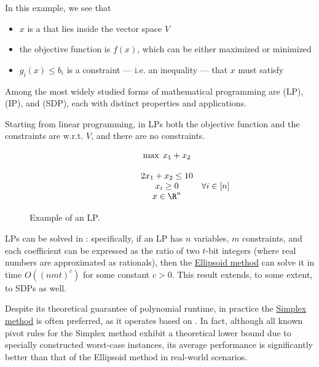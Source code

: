 \documentclass[a4paper, 12pt]{report}
\begin{document}
    In this example, we see that

    \begin{itemize}
        \item $x$ is a  that lies inside the vector space $V$
        \item the objective function is $f(x)$, which can be either maximized or minimized
        \item $g_i(x) \le b_i$ is a constraint --- i.e. an inequality --- that $x$ must satisfy
    \end{itemize}

    Among the most widely studied forms of mathematical programming are  (LP),  (IP), and  (SDP), each with distinct properties and applications.

    Starting from linear programming, in LPs both the objective function and the constraints are  w.r.t. $V$, and there are no  constraints.

    \begin{figure}[H]
        \centering
        \[\begin{array}{ccl}
            \qquad\qquad\quad
            & \max \; x_1 + x_2 \\\\
            & 2x_1 + x_2 \le 10 \\
            & x_i \ge 0 & \forall i \in [n]\\
            & x \in \R^n
        \end{array}\]
        \caption{Example of an LP.}
    \end{figure}
   
    LPs can be solved in : specifically, if an LP has $n$ variables, $m$ constraints, and each coefficient can be expressed as the ratio of two $t$-bit integers (where real numbers are approximated as rationals), then the \href{https://en.wikipedia.org/wiki/Ellipsoid_method}{Ellipsoid method} can solve it in time $O((nmt)^c)$ for some constant $c > 0$. This result extends, to some extent, to SDPs as well.

    Despite its theoretical guarantee of polynomial runtime, in practice the \href{https://en.wikipedia.org/wiki/Simplex_algorithm}{Simplex method} is often preferred, as it operates based on . In fact, although all known pivot rules for the Simplex method exhibit a theoretical  lower bound due to specially constructed worst-case instances, its average performance is significantly better than that of the Ellipsoid method in real-world scenarios.
\end{document}
